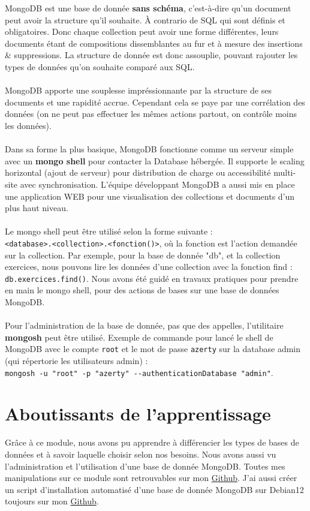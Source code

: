 MongoDB est une base de donnée \textbf{sans schéma}, c'est-à-dire qu'un document peut avoir la structure qu'il souhaite. À contrario de SQL qui sont définis et obligatoires. Donc chaque collection peut avoir une forme différentes, leurs documents étant de compositions dissemblantes au fur et à mesure des insertions \& suppressions. La structure de donnée est donc assouplie, pouvant rajouter les types de données qu'on souhaite comparé aux SQL.
\\ \\
MongoDB apporte une souplesse impréssionnante par la structure de ses documents et une rapidité accrue. Cependant cela se paye par une corrélation des données (on ne peut pas effectuer les mêmes actions partout, on contrôle moins les données).
\\ \\
Dans sa forme la plus basique, MongoDB fonctionne comme un serveur simple avec un \textbf{mongo shell} pour contacter la Database hébergée. Il supporte le scaling horizontal (ajout de serveur) pour distribution de charge ou accessibilité multi-site avec synchronisation. L'équipe développant MongoDB a aussi mis en place une application WEB pour une visualisation des collections et documents d'un plus haut niveau.
\\ \\
Le mongo shell peut être utilisé selon la forme suivante : \\ \verb|<database>.<collection>.<fonction()>|, où la fonction est l'action demandée sur la collection. Par exemple, pour la base de donnée "db", et la collection exercices, nous pouvons lire les données d'une collection avec la fonction find : \verb|db.exercices.find()|. Nous avons été guidé en travaux pratiques pour prendre en main le mongo shell, pour des actions de bases sur une base de données MongoDB.
\\ \\
Pour l'administration de la base de donnée, pas que des appelles, l'utilitaire \textbf{mongosh} peut être utilisé. Exemple de commande pour lancé le shell de MongoDB avec le compte \verb|root| et le mot de passe \verb|azerty| sur la database admin (qui répertorie les utilisateurs admin) : \\ \verb|mongosh -u "root" -p "azerty" --authenticationDatabase "admin"|.

\section{Aboutissants de l'apprentissage}

Grâce à ce module, nous avons pu apprendre à différencier les types de bases de données et à savoir laquelle choisir selon nos besoins. Nous avons aussi vu l'administration et l'utilisation d'une base de donnée MongoDB. Toutes mes manipulations sur ce module sont retrouvables sur mon \href{https://github.com/xeylou/r310}{Github}. J'ai aussi créer un script d'installation automatisé d'une base de donnée MongoDB sur Debian12 toujours sur mon \href{https://gist.github.com/xeylou/ca01e4f17e6bbcc5e8bba042b37771d3}{Github}.